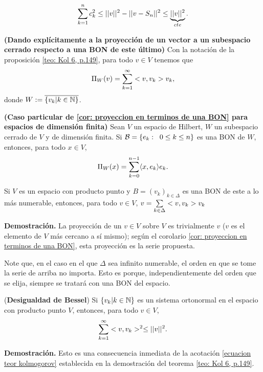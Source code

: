 \begin{equation} \label{ecuacion teor kolmogorov}
\sum\limits_{k=1}^{n}c_{k}^{2} \leq ||v||^{2}-||v-S_{n}||^{2} \leq 
\underbrace{||v||^{2}}_{cte}.
\end{equation}

\QEDB
\vspace{0.2cm}


\begin{cor} \label{cor: proyeccion en terminos de una BON}
\textbf{(Dando explícitamente a la proyección de un vector
a un subespacio cerrado respecto a una BON de este último)}
Con la notación de la proposición \ref{teo: Kol 6, p.149},
para todo $v \in V$
tenemos que
\[
\Pi_{W}(v) = \sum\limits_{k=1}^{\infty}<v, v_{k}>v_{k},
\]
donde $W := \overline{\{v_{k}| k \in \mathbb{N} \}}$. 
\end{cor}

\begin{cor}
\label{cor: proyeccion en terminos de BON}
\textbf{(Caso particular de \ref{cor: proyeccion en terminos de una BON} para
espacios de dimensión finita)}
Sean $V$ un espacio de Hilbert, $W$ un subespacio cerrado de $V$
y de dimensión finita. Si 
$\mathcal{B} = \{ e_{k}: \hspace{0.2cm} 0 \leq k \leq n \}$
es una BON de $W$, entonces, para todo $x \in V$,
\[
\Pi_{W}(x) = \sum\limits_{k=0}^{n-1} \langle x, e_{k} \rangle e_{k}.
\]  
\end{cor}


\begin{cor} \label{cor: representacion de un vector respecto a una BON}
Si $V$ es un espacio con producto punto 
y $B=(v_{k})_{k \in \Delta}$ es una BON de este
a lo más numerable, entonces, para todo
$v \in V$, $v = \sum\limits_{k \in \Delta}^{}<v, v_{k}>v_{k}$
\end{cor}
\noindent
\textbf{Demostración.}
La proyección de un $v \in V$ sobre $V$ es trivialmente $v$
($v$ es el elemento de $V$ más cercano a sí mismo); según el corolario
\ref{cor: proyeccion en terminos de una BON}, esta
proyección es la serie propuesta. \QEDB
\vspace{0.2cm}

Note que, en el caso en el que $\Delta$ sea infinito numerable,
el orden en que se tome la serie de arriba no importa. Esto es porque,
independientemente del orden que se elija, siempre se tratará con
una BON del espacio. \\

\begin{cor}(\textbf{Desigualdad de Bessel})
Si $\{ v_{k} | k \in \mathbb{N} \}$ es un sistema ortonormal en 
el espacio con producto punto $V$, entonces, para todo $v\in V$,
\[
\sum\limits_{k=1}^{\infty}<v , v_{k} >^{2} \leq ||v||^{2}.
\]
\end{cor}
\noindent
\textbf{Demostración.}
Esto es una consecuencia inmediata de la acotación
\eqref{ecuacion teor kolmogorov} establecida en la demostración
del teorema \ref{teo: Kol 6, p.149}.
\QEDB
\vspace{0.2cm}



